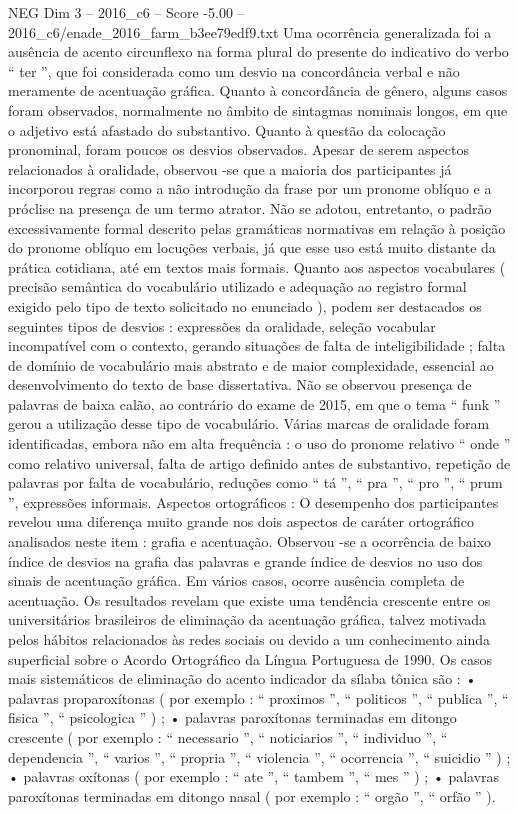 \begin{textsample}{NEG Dim 3 – 2016\_c6 – Score -5.00 – 2016\_c6/enade\_2016\_farm\_b3ee79edf9.txt}
Uma ocorrência generalizada foi a ausência de acento circunflexo na forma plural do presente do indicativo do verbo “ ter ”, que foi considerada como um desvio na concordância verbal e não meramente de acentuação gráfica.
Quanto à concordância de gênero, alguns casos foram observados, normalmente no âmbito de sintagmas nominais longos, em que o adjetivo está afastado do substantivo.
Quanto à questão da colocação pronominal, foram poucos os desvios observados.
Apesar de serem aspectos relacionados à oralidade, observou -se que a maioria dos participantes já incorporou regras como a não introdução da frase por um pronome oblíquo e a próclise na presença de um termo atrator.
Não se adotou, entretanto, o padrão excessivamente formal descrito pelas gramáticas normativas em relação à posição do pronome oblíquo em locuções verbais, já que esse uso está muito distante da prática cotidiana, até em textos mais formais.
Quanto aos aspectos vocabulares ( precisão semântica do vocabulário utilizado e adequação ao registro formal exigido pelo tipo de texto solicitado no enunciado ), podem ser destacados os seguintes tipos de desvios : expressões da oralidade, seleção vocabular incompatível com o contexto, gerando situações de falta de inteligibilidade ; falta de domínio de vocabulário mais abstrato e de maior complexidade, essencial ao desenvolvimento do texto de base dissertativa.
Não se observou presença de palavras de baixa calão, ao contrário do exame de 2015, em que o tema “ funk ” gerou a utilização desse tipo de vocabulário.
Várias marcas de oralidade foram identificadas, embora não em alta frequência : o uso do pronome relativo “ onde ” como relativo universal, falta de artigo definido antes de substantivo, repetição de palavras por falta de vocabulário, reduções como “ tá ”, “ pra ”, “ pro ”, “ prum ”, expressões informais.
Aspectos ortográficos : O desempenho dos participantes revelou uma diferença muito grande nos dois aspectos de caráter ortográfico analisados neste item : grafia e acentuação.
Observou -se a ocorrência de baixo índice de desvios na grafia das palavras e grande índice de desvios no uso dos sinais de acentuação gráfica.
Em vários casos, ocorre ausência completa de acentuação.
Os resultados revelam que existe uma tendência crescente entre os universitários brasileiros de eliminação da acentuação gráfica, talvez motivada pelos hábitos relacionados às redes sociais ou devido a um conhecimento ainda superficial sobre o Acordo Ortográfico da Língua Portuguesa de 1990.
Os casos mais sistemáticos de eliminação do acento indicador da sílaba tônica são : • palavras proparoxítonas ( por exemplo : “ proximos ”, “ politicos ”, “ publica ”, “ fisica ”, “ psicologica ” ) ; • palavras paroxítonas terminadas em ditongo crescente ( por exemplo : “ necessario ”, “ noticiarios ”, “ individuo ”, “ dependencia ”, “ varios ”, “ propria ”, “ violencia ”, “ ocorrencia ”, “ suicidio ” ) ; • palavras oxítonas ( por exemplo : “ ate ”, “ tambem ”, “ mes ” ) ; • palavras paroxítonas terminadas em ditongo nasal ( por exemplo : “ orgão ”, “ orfão ” ).

\end{textsample}

